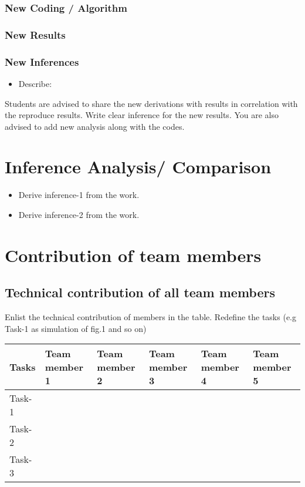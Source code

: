 \documentclass{article}
\begin{document}
\subsubsection{New Coding / Algorithm}

\subsubsection{New Results}

\subsubsection{New Inferences}
\begin{itemize}
    \item Describe:
\end{itemize}

Students are advised to share the new derivations with results in correlation with the  reproduce results. Write clear inference for the new results. You are also advised to add new analysis along with the codes.


\section{Inference Analysis/ Comparison}

\begin{itemize}

\item Derive inference-1 from the work.

\item Derive inference-2 from the work.
\end{itemize}

\section{ Contribution of team members}
\subsection{Technical contribution of all team members }
Enlist the technical contribution of members in the table. Redefine the tasks (e.g Task-1 as simulation of fig.1 and so on)
\begin{table}[h]
\centering
\begin{tabular}{|l|l|l|l|l|l|}
\hline
Tasks  & Team member 1 & Team member 2 & Team member 3 & Team member 4 & Team member 5 \\ \hline
Task-1 &               &               &               &               &               \\ \hline
Task-2 &               &               &               &               &               \\ \hline
Task-3 &               &               &               &               &               \\ \hline
\end{tabular}
\end{table}
\end{document}
